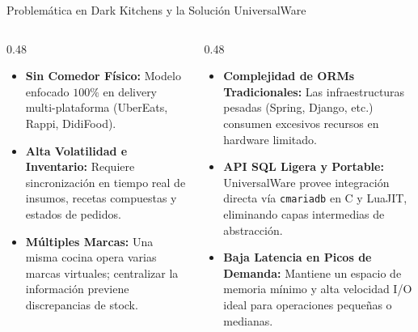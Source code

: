 \documentclass[10pt,aspectratio=169]{beamer}
\begin{document}
\begin{frame}{Problemática en Dark Kitchens y la Solución UniversalWare}
    \begin{columns}[T]
        \begin{column}{0.48\textwidth}
            \begin{itemize}
                \item \textbf{Sin Comedor Físico:} Modelo enfocado $100\%$ en delivery multi-plataforma (UberEats, Rappi, DidiFood).
                \item \textbf{Alta Volatilidad e Inventario:} Requiere sincronización en tiempo real de insumos, recetas compuestas y estados de pedidos.
                \item \textbf{Múltiples Marcas:} Una misma cocina opera varias marcas virtuales; centralizar la información previene discrepancias de stock.
            \end{itemize}
        \end{column}

        \begin{column}{0.48\textwidth}
            \begin{itemize}
                \item \textbf{Complejidad de ORMs Tradicionales:} Las infraestructuras pesadas (Spring, Django, etc.) consumen excesivos recursos en hardware limitado.
                \item \textbf{API SQL Ligera y Portable:} UniversalWare provee integración directa vía \texttt{cmariadb} en C y LuaJIT, eliminando capas intermedias de abstracción.
                \item \textbf{Baja Latencia en Picos de Demanda:} Mantiene un espacio de memoria mínimo y alta velocidad I/O ideal para operaciones pequeñas o medianas.
            \end{itemize}
        \end{column}
    \end{columns}
\end{frame}
\end{document}

